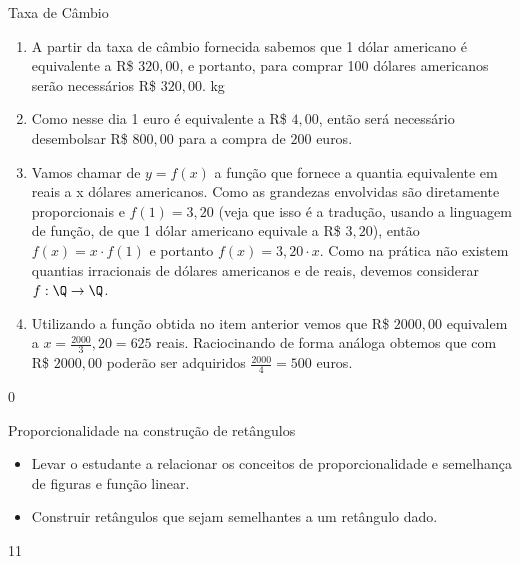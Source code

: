 \begin{answer}{Taxa de Câmbio}
{
\begin{enumerate}

\item A partir da taxa de câmbio fornecida sabemos que 1 dólar americano é equivalente a R\$ $320{,}00$, e portanto, para comprar 100 dólares americanos serão necessários R\$ $320{,}00$. \si{kg}

\item Como nesse dia 1 euro é equivalente a R\$ $4{,}00$, então será necessário desembolsar R\$ $800{,}00$ para a compra de $200$ euros.

\item Vamos chamar de $y=f(x)$ a função que fornece a quantia equivalente em reais a x dólares americanos. Como as grandezas envolvidas são diretamente proporcionais e $f(1)=3{,}20$ (veja que isso é a tradução, usando a linguagem de função, de que 1 dólar americano equivale a R\$ $3{,}20$), então $f(x)=x\cdot f(1)$ e portanto $f(x)=3{,}20\cdot x$. Como na prática não existem quantias irracionais de dólares americanos e de reais, devemos considerar $f:\Q\rightarrow\Q$.

\item Utilizando a função obtida no item anterior vemos que R\$ $2000,00$ equivalem a $x\displaystyle=\frac{2000}{3}{,}20=625$ reais. Raciocinando de forma análoga obtemos que com R\$ $2000{,}00$ poderão ser adquiridos $\displaystyle\frac{2000}{4}=500$ euros.
\end{enumerate}
}{0}
\end{answer}
\begin{objectives}{Proporcionalidade na construção de retângulos}
{
\begin{itemize}
\item Levar o estudante a relacionar os conceitos de proporcionalidade e semelhança de figuras e função linear.

\item Construir retângulos que sejam semelhantes a um retângulo dado.

\end{itemize}
}{1}{1}
\end{objectives}
\clearmargin
\marginpar{\vspace{.5em}}

